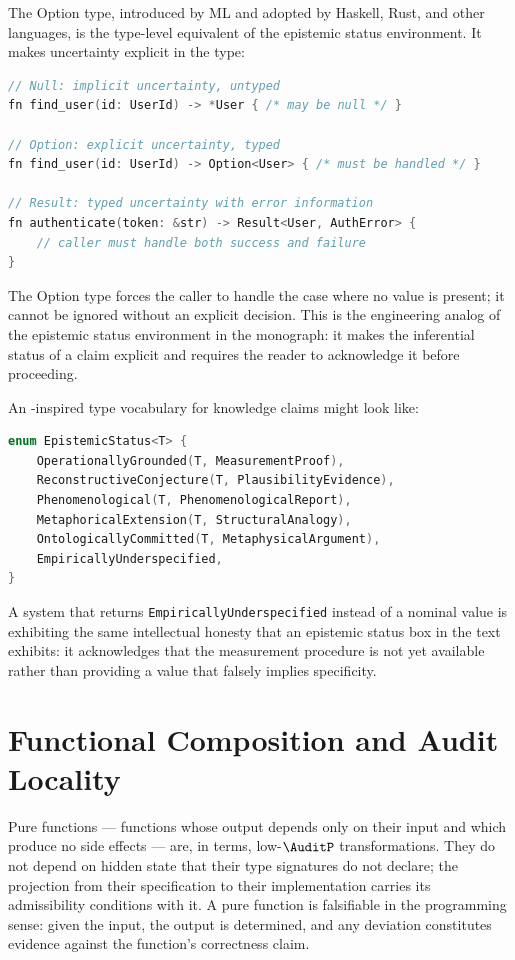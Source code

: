 The Option type, introduced by ML and adopted by Haskell,
Rust, and other languages, is the type-level equivalent
of the epistemic status environment. It makes uncertainty
explicit in the type:

\begin{lstlisting}[language=C, caption={Option as Typed Uncertainty}]
// Null: implicit uncertainty, untyped
fn find_user(id: UserId) -> *User { /* may be null */ }

// Option: explicit uncertainty, typed
fn find_user(id: UserId) -> Option<User> { /* must be handled */ }

// Result: typed uncertainty with error information
fn authenticate(token: &str) -> Result<User, AuthError> {
    // caller must handle both success and failure
}
\end{lstlisting}

The Option type forces the caller to handle the case
where no value is present; it cannot be ignored without
an explicit decision. This is the engineering analog
of the epistemic status environment in the \Ortyx{}
monograph: it makes the inferential status of a claim
explicit and requires the reader to acknowledge it
before proceeding.

An \Ortyx{}-inspired type vocabulary for knowledge
claims might look like:

\begin{lstlisting}[language=C, caption={Typed Epistemic Status}]
enum EpistemicStatus<T> {
    OperationallyGrounded(T, MeasurementProof),
    ReconstructiveConjecture(T, PlausibilityEvidence),
    Phenomenological(T, PhenomenologicalReport),
    MetaphoricalExtension(T, StructuralAnalogy),
    OntologicallyCommitted(T, MetaphysicalArgument),
    EmpiricallyUnderspecified,
}
\end{lstlisting}

A system that returns \texttt{EmpiricallyUnderspecified}
instead of a nominal value is exhibiting the same
intellectual honesty that an epistemic status box
in the text exhibits: it acknowledges that the
measurement procedure is not yet available rather
than providing a value that falsely implies specificity.

\section{Functional Composition and Audit Locality}
\label{sec:functional-composition}

Pure functions --- functions whose output depends only
on their input and which produce no side effects ---
are, in \Ortyx{} terms, low-$\AuditP$ transformations.
They do not depend on hidden state that their type
signatures do not declare; the projection from their
specification to their implementation carries its
admissibility conditions with it. A pure function is
falsifiable in the programming sense: given the input,
the output is determined, and any deviation constitutes
evidence against the function's correctness claim.

